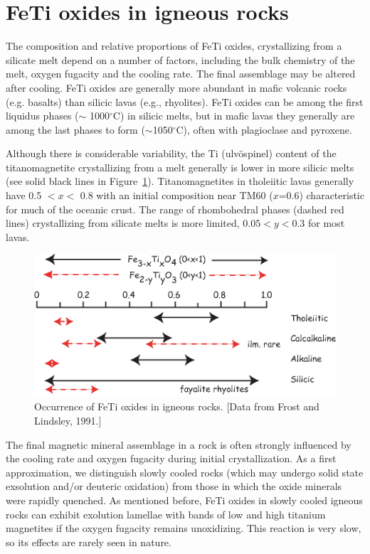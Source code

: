 \section{FeTi oxides in igneous rocks}

The composition and relative proportions of FeTi oxides, crystallizing from a silicate melt depend on a number of factors, including the bulk chemistry of the melt, oxygen fugacity and the cooling rate. The final assemblage may be altered after cooling.  FeTi oxides are generally more abundant in mafic volcanic rocks (e.g. basalts) than silicic lavas (e.g., rhyolites).  FeTi oxides can be among the first liquidus phases ($\sim$ 1000$^{\circ}$C) in silicic melts, but in mafic lavas they generally are among the last phases to form ($\sim$1050$^{\circ}$C), often with plagioclase and pyroxene.  

Although there is considerable variability, the Ti (ulv\"ospinel) content of the titanomagnetite crystallizing from a melt generally is lower in more silicic melts (see solid black lines in Figure~\ref{fig:igneous}).   Titanomagnetites in tholeiitic lavas generally have 0.5 $<x<$ 0.8 with an initial composition near TM60 ($x$=0.6) characteristic for much of the oceanic crust.  The range of rhombohedral phases (dashed red lines)  crystallizing from silicate melts is more limited, $0.05<y<0.3$ for most lavas.   




\begin{figure}[htb]
\includegraphics[width=13 cm]{EPSfiles/igneous.eps}
\caption{Occurrence of FeTi oxides in igneous rocks.  [Data from Frost and Lindsley, 1991.]}
\label{fig:igneous}
\end{figure}\nocite{frost91}


The final magnetic mineral assemblage in a rock is often strongly influenced by the cooling rate and oxygen fugacity during initial crystallization.  As a first approximation, we distinguish slowly cooled rocks (which may undergo solid state exsolution and/or deuteric oxidation) from those in which the oxide minerals were rapidly quenched.  As mentioned before, FeTi oxides in slowly cooled igneous rocks can exhibit exolution lamellae with bands of low and high titanium magnetites if the oxygen fugacity remains unoxidizing.   This reaction is very slow, so its effects are rarely seen in nature. 

